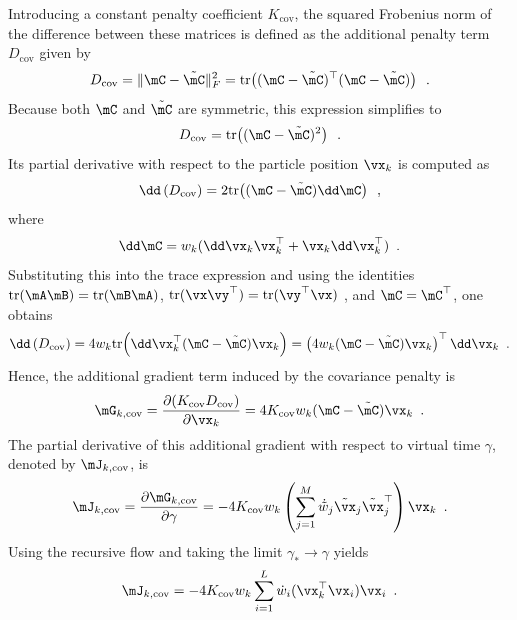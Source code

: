 Introducing a constant penalty coefficient $K_{\text{cov}}$, the squared Frobenius norm of the difference between these matrices is defined as the additional penalty term $D_{\text{cov}}$ given by
\begin{equation}
	D_{\text{cov}} = \|\mC - \tilde{\mC}\|_F^2 = \text{tr}\!\left( (\mC - \tilde{\mC})^{\top} (\mC - \tilde{\mC}) \right) \enspace.
\end{equation}
Because both $\mC$ and $\tilde{\mC}$ are symmetric, this expression simplifies to
\begin{equation}
	D_{\text{cov}} = \text{tr}\!\left( (\mC - \tilde{\mC})^2 \right) \enspace.
	\label{eq:D_Cov}
\end{equation}
Its partial derivative with respect to the particle position $\vx_k$ is computed as
\begin{equation}
	\dd\,(D_{\text{cov}}) = 2 \text{tr}\!\left( (\mC - \tilde{\mC}) \dd\mC \right) \enspace,
\end{equation}
where
\begin{equation}
	\dd\mC = w_k (\dd\vx_k \vx_k^{\top} + \vx_k \dd\vx_k^{\top}) \enspace.
\end{equation}
Substituting this into the trace expression and using the identities $\text{tr}(\mA\mB)=\text{tr}(\mB\mA)$, $\text{tr}(\vx\vy^{\top})=\text{tr}(\vy^{\top}\vx)$ \cite{MC}, and $\mC=\mC^{\top}$, one obtains
\begin{equation}
	\dd\,(D_{\text{cov}}) = 4 w_k \text{tr}\!\left( \dd\vx_k^{\top} (\mC - \tilde{\mC}) \vx_k \right) = \left( 4 w_k (\mC - \tilde{\mC}) \vx_k \right)^{\top} \dd\vx_k \enspace.
\end{equation}
Hence, the additional gradient term induced by the covariance penalty is
\begin{equation}
	\mG_{k, \text{cov}} = \frac{\partial (K_{\text{cov}} D_{\text{cov}})}{\partial \vx_k} = 4 K_{\text{cov}} w_k (\mC - \tilde{\mC}) \vx_k \enspace.
\end{equation}
The partial derivative of this additional gradient with respect to virtual time $\gamma$, denoted by $\mJ_{k, \text{cov}}$, is
\begin{equation}
	\mJ_{k, \text{cov}} = \frac{\partial \mG_{k, \text{cov}}}{\partial \gamma} = -4 K_{\text{cov}} w_k \left( \sum_{j=1}^M \dot{\tilde{w}}_j \tilde{\vx}_j \tilde{\vx}_j^{\top} \right) \vx_k \enspace.
\end{equation}
Using the recursive flow and taking the limit $\gamma_* \to \gamma$ yields
\begin{equation}
	\mJ_{k, \text{cov}} = -4 K_{\text{cov}} w_k \sum_{i=1}^L \dot{w}_i (\vx_k^{\top} \vx_i) \vx_i \enspace.
\end{equation}
